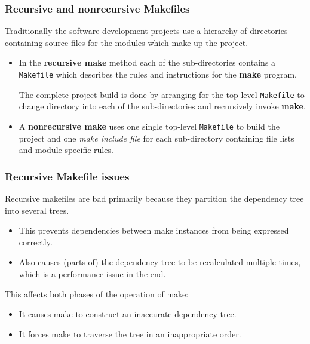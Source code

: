 \documentclass[11pt]{beamer}
\begin{document}

\begin{frame}
  \frametitle{Recursive and nonrecursive Makefiles}

  \small{
  Traditionally the software development projects use a hierarchy of
  directories containing source files for the modules which make up the
  project.
  
  \vspace{2mm}
  \begin{itemize}[<+->]
    \item In the \textbf{recursive make} method each of the sub-directories
      contains a \texttt{Makefile} which describes the rules and instructions
      for the \textbf{make} program.

      The complete project build is done by arranging for the top-level
      \texttt{Makefile} to change directory into each of the sub-directories
      and recursively invoke \textbf{make}.\\[4mm]

    \item A \textbf{nonrecursive make} uses one single top-level
      \texttt{Makefile} to build the project and one \emph{make include file}
      for each sub-directory containing file lists and module-specific rules.
  \end{itemize}
  }
\end{frame}


\begin{frame}
  \frametitle{Recursive Makefile issues}
  Recursive makefiles are bad primarily because they partition the dependency
  tree into several trees.

  \begin{itemize}
    \item This prevents dependencies between make instances from being
      expressed correctly.\\[2mm]
    \item Also causes (parts of) the dependency tree to be recalculated
      multiple times, which is a performance issue in the end.
  \end{itemize}

  \pause
  \vspace{5mm}
  This affects both phases of the operation of make:

  \begin{itemize}
    \item It causes make to construct an inaccurate dependency tree.\\[2mm]
    \item It forces make to traverse the tree in an inappropriate order.
  \end{itemize}
\end{frame}
\end{document}
